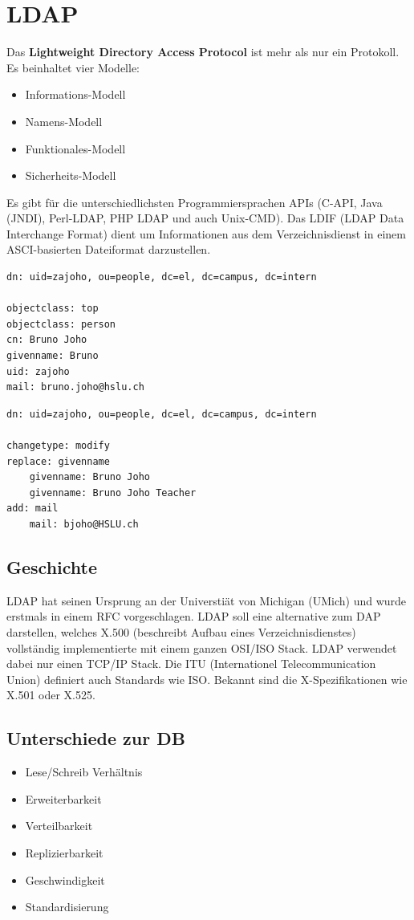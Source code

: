 \section{LDAP}
Das \textbf{Lightweight Directory Access Protocol} ist mehr als nur ein Protokoll. Es beinhaltet vier Modelle:
\begin{itemize}
	\item Informations-Modell
	\item Namens-Modell
	\item Funktionales-Modell
	\item Sicherheits-Modell
\end{itemize}
Es gibt für die unterschiedlichsten Programmiersprachen APIs (C-API, Java (JNDI), Perl-LDAP, PHP LDAP und auch Unix-CMD). Das LDIF (LDAP Data Interchange Format) dient um Informationen aus dem Verzeichnisdienst in einem ASCI-basierten Dateiformat darzustellen.


\begin{lstlisting}[caption=Beispiel LDIF]
dn: uid=zajoho, ou=people, dc=el, dc=campus, dc=intern

objectclass: top
objectclass: person
cn: Bruno Joho
givenname: Bruno
uid: zajoho
mail: bruno.joho@hslu.ch
\end{lstlisting}


\begin{lstlisting}[caption=Beispiel LDIF Update]
dn: uid=zajoho, ou=people, dc=el, dc=campus, dc=intern

changetype: modify
replace: givenname
	givenname: Bruno Joho
	givenname: Bruno Joho Teacher
add: mail
	mail: bjoho@HSLU.ch
\end{lstlisting}

\subsection{Geschichte}
LDAP hat seinen Ursprung an der Universtiät von Michigan (UMich) und wurde erstmals in einem RFC vorgeschlagen. LDAP soll eine alternative zum DAP darstellen, welches X.500 (beschreibt Aufbau eines Verzeichnisdienstes) vollständig implementierte mit einem ganzen OSI/ISO Stack. LDAP verwendet dabei nur einen TCP/IP Stack. Die ITU (Internationel Telecommunication Union) definiert auch Standards wie ISO. Bekannt sind die X-Spezifikationen wie X.501 oder X.525.

\subsection{Unterschiede zur DB}
\begin{itemize}
	\item Lese/Schreib Verhältnis
	\item Erweiterbarkeit
	\item Verteilbarkeit
	\item Replizierbarkeit
	\item Geschwindigkeit
	\item Standardisierung 
\end{itemize}

